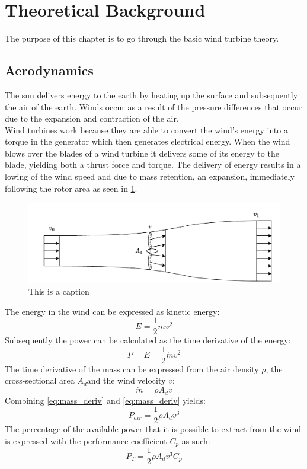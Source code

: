 \section{Theoretical Background} \label{sec:theory}
The purpose of this chapter is to go through the basic wind turbine theory. 

\subsection{Aerodynamics}
The sun delivers energy to the earth by heating up the surface and subsequently the air of the earth. Winds occur as a result of the pressure differences that occur due to the expansion and contraction of the air. \\

Wind turbines work because they are able to convert the wind's energy into a torque in the generator which then generates electrical energy. When the wind blows over the blades of a wind turbine it delivers some of its energy to the blade, yielding both a thrust force and torque. The delivery of energy results in a lowing of the wind speed and due to mass retention, an expansion, immediately following the rotor area as seen in \cref{fig:betz}.
\begin{figure}[h]
	\centering
	\includegraphics[width=0.8\linewidth]{Graphics/FlowThroughRotor.pdf}
	\caption{This is a caption}
	\label{fig:betz}
\end{figure}

The energy in the wind can be expressed as kinetic energy:
\begin{equation} \label{eq:energy}
	E = \dfrac{1}{2} m v^2
\end{equation}
Subsequently the power can be calculated as the time derivative of the energy:
\begin{equation} \label{eq:power}
	P = \dot{E} = \dfrac{1}{2} \dot{m} v^2
\end{equation}
The time derivative of the mass can be expressed from the air density $ \rho $, the cross-sectional area $ A_d $and the wind velocity $ v $:
\begin{equation}\label{eq:mass_deriv}
	\dot{m} = \rho A_d v
\end{equation}
Combining \cref{eq:mass_deriv} and \cref{eq:mass_deriv} yields:
\begin{equation}\label{eq:power2}
	P_{air} = \dfrac{1}{2} \rho A_d v^3
\end{equation}
The percentage of the available power that it is possible to extract from the wind is expressed with the performance coefficient $ C_p $ as such:
\begin{equation}\label{eq:power_w_Cp}
	P_{T} = \dfrac{1}{2} \rho A_d v^3 C_p
\end{equation}